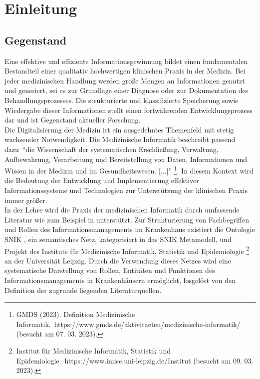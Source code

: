 \chapter{Einleitung}\label{ch:introduction}
\section{Gegenstand}\label{sec:gegenstand}
Eine effektive und effiziente Informationsgewinnung bildet einen fundamentalen Bestandteil einer qualitativ hochwertigen klinischen Praxis in der Medizin. 
Bei jeder medizinischen Handlung werden große Mengen an Informationen genutzt und generiert, sei es zur Grundlage einer Diagnose oder zur Dokumentation des Behandlungsprozesses. 
Die strukturierte und klassifizierte Speicherung sowie Wiedergabe dieser Informationen stellt einen fortwährenden Entwicklungsprozess dar und ist Gegenstand aktueller Forschung.\\

Die Digitalisierung der Medizin ist ein ausgedehntes Themenfeld mit stetig wachsender Notwendigkeit. 
Die Medizinische Informatik beschreibt passend dazu~\enquote{die Wissenschaft der systematischen Erschließung, Verwaltung, Aufbewahrung, Verarbeitung und Bereitstellung von Daten, Informationen und Wissen in der Medizin und im Gesundheitswesen. [$\dots$]}
\footnote{\raggedright{}GMDS (2023). Definition Medizinische Informatik.\ https://www.gmds.de/aktivitaeten/medizinische-informatik/ (besucht am 07. 03. 2023).}.
In diesem Kontext wird die Bedeutung der Entwicklung und Implementierung effektiver Informationssysteme und Technologien zur Unterstützung der klinischen Praxis immer größer.\\

In der Lehre wird die Praxis der medizinischen Informatik durch umfassende Literatur wie zum Beispiel in \citet{bb} unterstützt.
Zur Strukturierung von Fachbegriffen und Rollen des Informationsmanagements im Krankenhaus existiert die Ontologie SNIK \citep{semantischesnetz}, ein semantisches Netz, kategorisiert in das SNIK Metamodell, und Projekt des Instituts für Medizinische Informatik, Statistik und Epidemiologie 
\footnote{\raggedright{}Institut für Medizinische Informatik, Statistik und Epidemiologie.\ https://www.imise.uni-leipzig.de/Institut (besucht am 09. 03. 2023).} an der Universität Leipzig.
Durch die Verwendung dieses Netzes wird eine systematische Darstellung von Rollen, Entitäten und Funktionen des Informationsmanagements in Krankenhäusern ermöglicht, losgelöst von den Definition der zugrunde liegenden Literaturquellen.\\

